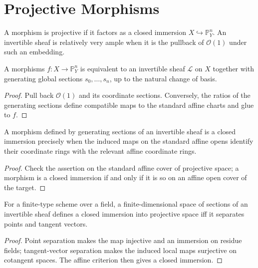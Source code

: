 \section{Projective Morphisms}

\begin{definition}
\label{def:II-7-projective}
A morphism is projective if it factors as a closed immersion $X\hookrightarrow\mathbb P^n_Y$. An
invertible sheaf is relatively very ample when it is the pullback of $\mathcal O(1)$ under such an embedding.
\end{definition}

\begin{theorem}
\label{thm:II-7-1}
A morphisms $f:X\to\mathbb P^n_Y$ is equivalent to an invertible sheaf $\mathcal L$ on $X$
together with generating global sections $s_0,\ldots,s_n$, up to the natural change of basis.
\end{theorem}
\begin{proof}
Pull back $\mathcal O(1)$ and its coordinate sections. Conversely, the ratios of the generating
sections define compatible maps to the standard affine charts and glue to $f$.
\end{proof}

\begin{proposition}
\label{prop:II-7-2}
A morphism defined by generating sections of an invertible sheaf is a closed immersion precisely
when the induced maps on the standard affine opens identify their coordinate rings with the relevant
affine coordinate rings.
\end{proposition}
\begin{proof}
Check the assertion on the standard affine cover of projective space; a morphism is a closed immersion
if and only if it is so on an affine open cover of the target.
\end{proof}

\begin{proposition}
\label{prop:II-7-3}
For a finite-type scheme over a field, a finite-dimensional space of sections of an invertible sheaf
defines a closed immersion into projective space iff it separates points and tangent vectors.
\end{proposition}
\begin{proof}
Point separation makes the map injective and an immersion on residue fields; tangent-vector separation
makes the induced local maps surjective on cotangent spaces. The affine criterion then gives a closed
immersion.
\end{proof}

